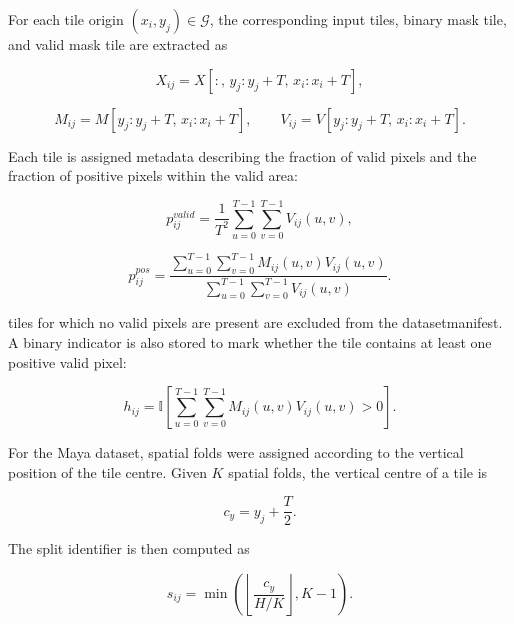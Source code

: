 For each tile origin \((x_i,y_j) \in \mathcal{G}\), the corresponding input tiles, binary mask tile, and valid mask tile are extracted as

\begin{equation}
X_{ij} = X[:,\, y_j:y_j+T,\, x_i:x_i+T],
\label{eq:input_tile}
\end{equation}

\begin{equation}
M_{ij} = M[y_j:y_j+T,\, x_i:x_i+T],
\qquad
V_{ij} = V[y_j:y_j+T,\, x_i:x_i+T].
\label{eq:mask_tiles}
\end{equation}

Each tile is assigned metadata describing the fraction of valid pixels and the fraction of positive pixels within the valid area:

\begin{equation}
p^{valid}_{ij}
=
\frac{1}{T^2}
\sum_{u=0}^{T-1}
\sum_{v=0}^{T-1}
V_{ij}(u,v),
\label{eq:valid_fraction}
\end{equation}

\begin{equation}
p^{pos}_{ij}
=
\frac{
\sum_{u=0}^{T-1}
\sum_{v=0}^{T-1}
M_{ij}(u,v)V_{ij}(u,v)
}{
\sum_{u=0}^{T-1}
\sum_{v=0}^{T-1}
V_{ij}(u,v)
}.
\label{eq:positive_fraction}
\end{equation}

tiles for which no valid pixels are present are excluded from the \gls{datasetmanifest}. A binary indicator is also stored to mark whether the tile contains at least one positive valid pixel:

\begin{equation}
h_{ij}
=
\mathbb{I}
\left[
\sum_{u=0}^{T-1}
\sum_{v=0}^{T-1}
M_{ij}(u,v)V_{ij}(u,v) > 0
\right].
\label{eq:has_positive_tile}
\end{equation}

For the Maya dataset, spatial folds were assigned according to the vertical position of the tile centre. Given \(K\) spatial folds, the vertical centre of a tile is

\begin{equation}
c_y = y_j + \frac{T}{2}.
\label{eq:tile_center_y}
\end{equation}

The split identifier is then computed as

\begin{equation}
s_{ij}
=
\min\left(
\left\lfloor
\frac{c_y}{H/K}
\right\rfloor,
K-1
\right).
\label{eq:vertical_split}
\end{equation}


